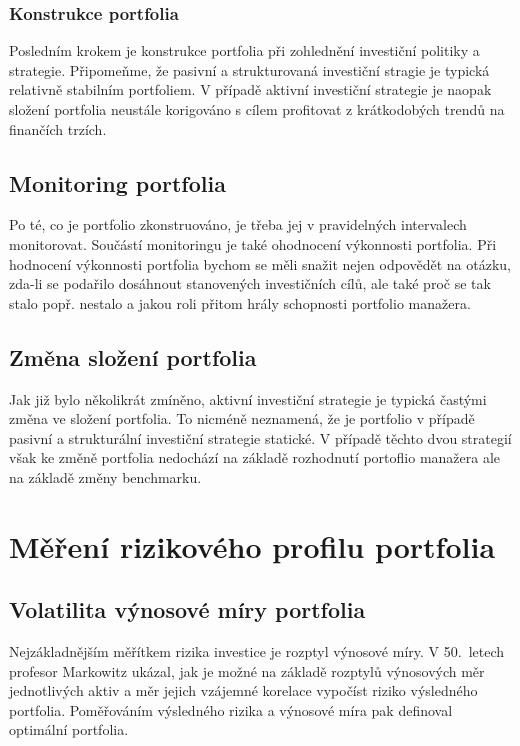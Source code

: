 \documentclass[a4paper]{book}
\begin{document}
\subsubsection{Konstrukce portfolia}

Posledním krokem je konstrukce portfolia při zohlednění investiční politiky a strategie. Připomeňme, že pasivní a strukturovaná investiční stragie je typická relativně stabilním portfoliem. V případě aktivní investiční strategie je naopak složení portfolia neustále korigováno s cílem profitovat z krátkodobých trendů na finančích trzích.

\subsection{Monitoring portfolia}

Po té, co je portfolio zkonstruováno, je třeba jej v pravidelných intervalech monitorovat. Součástí monitoringu je také ohodnocení výkonnosti portfolia. Při hodnocení výkonnosti portfolia bychom se měli snažit nejen odpovědět na otázku, zda-li se podařilo dosáhnout stanovených investičních cílů, ale také proč se tak stalo popř. nestalo a jakou roli přitom hrály schopnosti portfolio manažera.

\subsection{Změna složení portfolia}

Jak již bylo několikrát zmíněno, aktivní investiční strategie je typická častými změna ve složení portfolia. To nicméně neznamená, že je portfolio v případě pasivní a strukturální investiční strategie statické. V případě těchto dvou strategií však ke změně portfolia nedochází na základě rozhodnutí portoflio manažera ale na základě změny benchmarku.

\section{Měření rizikového profilu portfolia}

\subsection{Volatilita výnosové míry portfolia}

Nejzákladnějším měřítkem rizika investice je rozptyl výnosové míry. V 50.~letech profesor Markowitz ukázal, jak je možné na základě rozptylů výnosových měr jednotlivých aktiv a měr jejich vzájemné korelace vypočíst riziko výsledného portfolia. Poměřováním výsledného rizika a výnosové míra pak definoval optimální portfolia.
\end{document}
